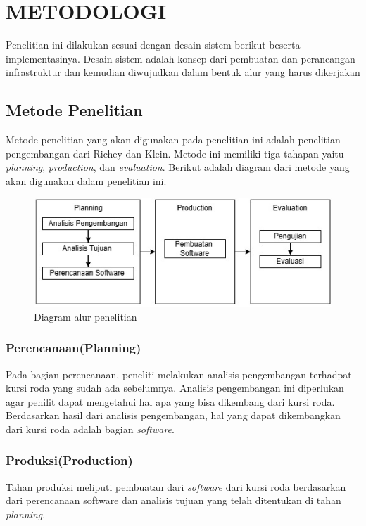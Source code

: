 \chapter{METODOLOGI}
Penelitian ini dilakukan sesuai dengan desain sistem berikut beserta implementasinya. Desain sistem adalah konsep dari pembuatan dan perancangan infrastruktur dan kemudian diwujudkan dalam bentuk alur yang harus dikerjakan

\section{Metode Penelitian}
Metode penelitian yang akan digunakan pada penelitian ini adalah penelitian pengembangan dari Richey dan Klein\cite{Sugiyono2019}. Metode ini memiliki tiga tahapan yaitu \emph{planning}, \emph{production}, dan \emph{evaluation}. Berikut adalah diagram dari metode yang akan digunakan dalam penelitian ini.
\begin{figure} [H] \centering
  \includegraphics[scale=0.6]{gambar/metodologi penelitian.jpg}
  \caption{Diagram alur penelitian}
  \label{fig:Metode penelitian }
\end{figure}
\subsection{Perencanaan(Planning)}
Pada bagian perencanaan, peneliti melakukan analisis pengembangan terhadpat kursi roda yang sudah ada sebelumnya. Analisis pengembangan ini diperlukan agar penilit dapat mengetahui hal apa yang bisa dikembang dari kursi roda. Berdasarkan hasil dari analisis pengembangan, hal yang dapat dikembangkan dari kursi roda adalah bagian \emph{software}.
\subsection{Produksi(Production)}
Tahan produksi meliputi pembuatan dari \emph{software} dari kursi roda berdasarkan dari perencanaan software dan analisis tujuan yang telah ditentukan di tahan \emph{planning}.
